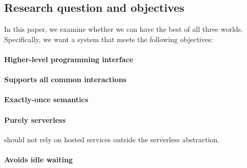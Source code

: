 \subsection{Research question and objectives}

In this paper, we examine whether we can have the best of all three worlds. Specifically, we want a system that meets the following objectives:

\paragraph{Higher-level programming interface}

\paragraph{Supports all common interactions}

\paragraph{Exactly-once semantics}

\paragraph{Purely serverless} should not rely on hosted services outside the
serverless abstraction.

\paragraph{Avoids idle waiting} 











